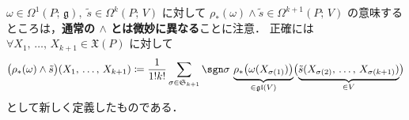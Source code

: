 \documentclass[TQFT_main]{subfiles}
\begin{document}
\begin{marker}
    $\omega \in \Omega^1(P;\, \mathfrak{g}),\; \tilde{s} \in \Omega^k(P;\, V)$ に対して $\rho_*(\omega) \wedge \tilde{s} \in \Omega^{k+1}(P;\, V)$ の意味するところは，\textbf{通常の $\bm{\wedge}$ とは微妙に異なる}ことに注意．
    正確には $\forall X_1,\, \dots,\, X_{k+1} \in \mathfrak{X}(P)$ に対して
    \begin{align}
        \bigl(\rho_*(\omega) \wedge \tilde{s} \bigr)(X_1,\, \dots,\, X_{k+1})
        \coloneqq \frac{1}{1!k!} \sum_{\sigma \in \mathfrak{S}_{k+1}} \sgn \sigma \, \underbrace{\rho_*\bigl(\omega(X_{\sigma(1)})\bigr)}_{\in \mathfrak{gl}(V)} \bigl( \underbrace{\tilde{s}(X_{\sigma(2)},\, \dots,\, X_{\sigma(k+1)})}_{\in V} \bigr) 
    \end{align}
    として新しく定義したものである．
\end{marker}
\end{document}
